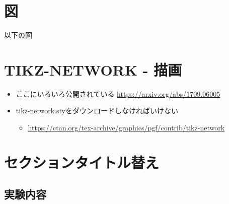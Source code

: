 \documentclass{jsarticle}           %
\renewcommand\thesection{\arabic{section}}
\renewcommand\thesubsection{\thesection.\arabic{subsection}}
\renewcommand\thesubsubsection{\thesubsection.\arabic{subsubsection}}
\theoremstyle{plain}
\theoremstyle{definition}
\theoremstyle{remark}
\begin{document}
    
\section{図} \label{section図}
以下の図
\begin{figure}
          
\end{figure}
%

\section{TIKZ-NETWORK - 描画} \label{TIKZ}
\begin{itemize}
  \item ここにいろいろ公開されている \url{https://arxiv.org/abs/1709.06005}
  \item tikz-network.styをダウンロードしなければいけない
        \begin{itemize}
          \item \url{https://ctan.org/tex-archive/graphics/pgf/contrib/tikz-network}
        \end{itemize}
\end{itemize}

    
\let\oldthesection=\thesection
\let\oldthesubsection=\thesubsection
\renewcommand{\thesection}{課題\arabic{section}}
\renewcommand{\thesubsection}{\thesection.\arabic{subsection}}
\renewcommand{\thesubsubsection}{\thesubsection.\arabic{subsubsection}}
\section{セクションタイトル替え} \label{課題1}
\subsection*{実験内容}
\end{document}
